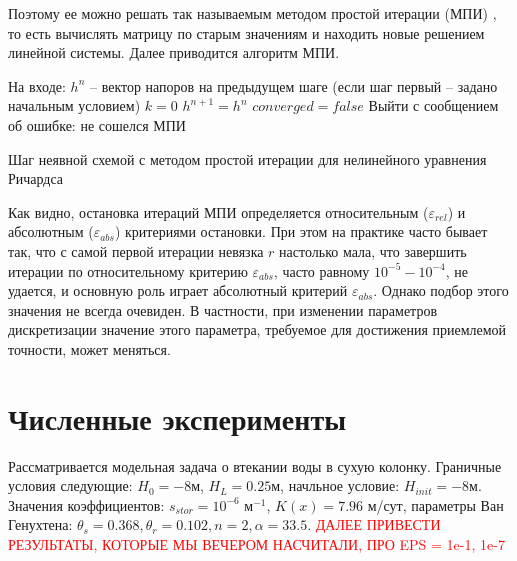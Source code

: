 \documentclass[a4paper,12pt]{article}
\begin{document}
 Поэтому ее можно решать так называемым методом простой итерации (МПИ) \cite{Celia1990}, то есть вычислять матрицу по старым значениям и находить новые решением линейной системы. Далее приводится алгоритм МПИ.
 
 	\begin{algorithm}[H]\label{alg:time_step_richards}
 	\SetAlgoLined
 	На входе: $h^n$ -- вектор напоров на предыдущем шаге (если шаг первый -- задано начальным условием)\;
 	$k = 0$\;
 	$h^{n+1} = h^n$\;
 	$converged = false$\;
 	{
 		Выйти с сообщением об ошибке: не сошелся МПИ\;
 	}
 	\caption{Шаг неявной схемой с методом простой итерации для нелинейного уравнения Ричардса}
 \end{algorithm}
 
 Как видно, остановка итераций МПИ определяется относительным ($\varepsilon_{rel}$) и абсолютным ($\varepsilon_{abs}$) критериями остановки. При этом на практике часто бывает так, что с самой первой итерации невязка $r$ настолько мала, что завершить итерации по относительному критерию $\varepsilon_{abs}$, часто равному $10^{-5} - 10^{-4}$, не удается, и основную роль играет абсолютный критерий $\varepsilon_{abs}$. Однако подбор этого значения не всегда очевиден. В частности, при изменении параметров дискретизации значение этого параметра, требуемое для достижения приемлемой точности, может меняться. 


\section{Численные эксперименты}
Рассматривается модельная задача о втекании воды в сухую колонку. Граничные условия следующие: $H_0 = -8 м$, $H_L = 0.25 м$, начльное условие: $H_{init} = -8 м$. Значения коэффициентов: $s_{stor} = 10^{-6}$ м$^{-1}$, $K(x) = 7.96$ м/сут, параметры Ван Генухтена: $\theta_s = 0.368, \theta_r = 0.102, n = 2, \alpha = 33.5$.
\textcolor{red}{ДАЛЕЕ ПРИВЕСТИ РЕЗУЛЬТАТЫ, КОТОРЫЕ МЫ ВЕЧЕРОМ НАСЧИТАЛИ, ПРО EPS = 1e-1, 1e-7}

\end{document}
